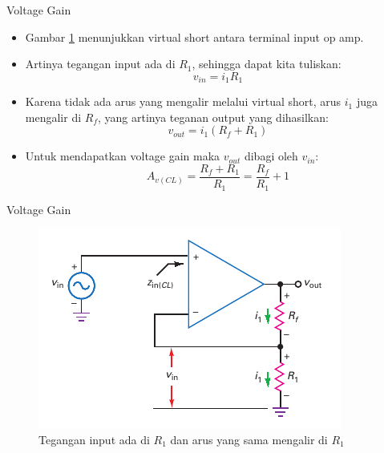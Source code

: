 \begin{frame}{Voltage Gain}
	\begin{itemize}
		\item Gambar \ref{fig-16.20} menunjukkan virtual short antara terminal input op amp.
		\item Artinya tegangan input ada di $ R_1 $, sehingga dapat kita tuliskan:\\
		
		\[ v_{in} = i_1 R_1 \]
		
		\item Karena tidak ada arus yang mengalir melalui virtual short, arus $ i_1 $ juga mengalir di $ R_f $, yang artinya teganan output yang dihasilkan:\\
		
		\[ v_{out} = i_1 (R_f + R_1) \]
		
		\item Untuk mendapatkan voltage gain maka $ v_{out} $ dibagi oleh $ v_{in} $:\\
		
		\begin{equation}\label{pers.16.12}
			A_{v(CL)} = \frac{R_f + R_1}{R_1} = \frac{R_f}{R_1} + 1
		\end{equation}
	
	\end{itemize}
\end{frame}

\begin{frame}{Voltage Gain}
	\begin{figure}
		\centering
		\includegraphics[height=0.7\textheight]{gambar/fig-16.20}
		\caption{Tegangan input ada di $ R_1 $ dan arus yang sama mengalir di $ R_1 $}
		\label{fig-16.20}
	\end{figure}
\end{frame}

